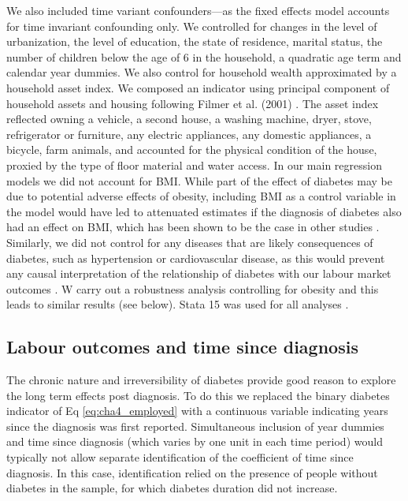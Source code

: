 \documentclass[12pt,english]{article}
\begin{document}
We also included time variant confounders---as the fixed effects model accounts for time invariant confounding only. We controlled for changes in the level of urbanization, the level of education, the state of residence, marital status, the number of children below the age of 6  in the household, a quadratic age term and calendar year dummies.  We also control for household wealth approximated by a household asset index. We composed an indicator using principal component of household assets and housing following Filmer et al. (2001) \parencite{Filmer2001}. The asset index reflected owning a vehicle, a second house, a washing machine, dryer, stove, refrigerator or furniture, any electric appliances, any domestic appliances, a bicycle, farm animals, and accounted for the physical condition of the house, proxied by the type of floor material and water access. In our main regression models we did not account for \ac{BMI}. While part of the effect of diabetes may be due to potential adverse effects of obesity, including \ac{BMI} as a control variable in the model would have led to attenuated estimates if the diagnosis of diabetes also had an effect on \ac{BMI}, which has been shown to be the case in other studies \parencite{Slade2012,DeFineOlivarius2015,Seuring2018}. Similarly, we did not control for any diseases that are likely consequences of diabetes, such as hypertension or cardiovascular disease, as this would prevent any causal interpretation of the relationship of diabetes with our labour market outcomes \parencite{Angrist2009a}. W carry out a robustness analysis controlling for obesity and this leads to similar results (see below). Stata 15 was used for all analyses \parencite{StataCorp2017}.


\subsection{Labour outcomes and time since diagnosis}

The chronic nature and irreversibility of diabetes provide good reason to explore the long term effects post diagnosis.  To do this we replaced the binary diabetes indicator of Eq \ref{eq:cha4_employed} with a continuous variable indicating years since the diagnosis was first reported. Simultaneous inclusion of year dummies and time since diagnosis (which varies by one unit in each time period) would typically not allow separate identification of the coefficient of time since diagnosis. In this case, identification relied on the presence of people without diabetes in the sample, for which diabetes duration did not increase.
\end{document}
